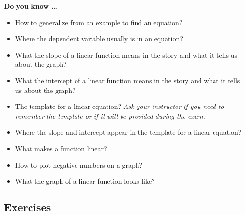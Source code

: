 


\noindent \textbf{Do you know \ldots}

\begin{itemize} 
\item How to generalize from an example to find an equation? 
\item Where the dependent variable usually is in an equation? 
\item What the slope of a linear function means in the story and what it tells us about the graph? 
\item What the intercept of a linear function means in the story and what it tells us about the graph?  
\item The template for a linear equation? \emph{Ask your instructor if you need to remember the template or if it will be provided during the exam.} 
\item Where the slope and intercept appear in the template for a linear equation?  
\item What makes a function linear? 
\item How to plot negative numbers on a graph? 
\item What the graph of a linear function looks like? 
  
\end{itemize}

\subsection*{Exercises}

